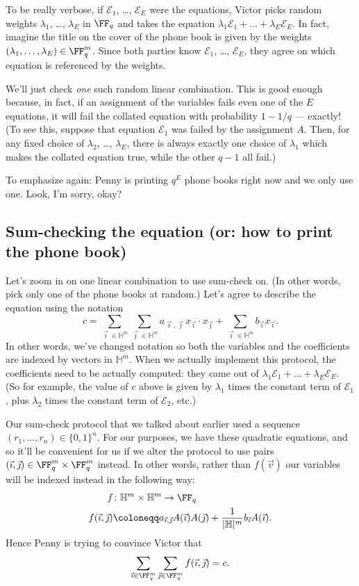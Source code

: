 \documentclass[11pt]{scrreprt}
\newcommand{\HH}{\mathbb H}
\begin{document}
To be really verbose, if $\mathcal{E}_1$, \dots, $\mathcal{E}_E$ were the equations,
Victor picks random weights $\lambda_1$, \dots, $\lambda_E$ in $\FF_q$
and takes the equation $\lambda_1 \mathcal{E}_1 + \dots + \lambda_E \mathcal{E}_E$.
In fact, imagine the title on the cover of the phone book is
given by the weights $(\lambda_1, \dots, \lambda_E) \in \FF_q^m$.
Since both parties know $\mathcal E_1$, \dots, $\mathcal E_E$,
they agree on which equation is referenced by the weights.

We'll just check \emph{one} such random linear combination.
This is good enough because, in fact,
if an assignment of the variables fails even one of the $E$ equations,
it will fail the collated equation with probability $1 - 1/q$ --- exactly!
(To see this, suppose that equation $\mathcal E_1$ was failed by the assignment $A$.
Then, for any fixed choice of $\lambda_2$, \dots, $\lambda_E$, there is always
exactly one choice of $\lambda_1$ which makes the collated equation true,
while the other $q-1$ all fail.)

To emphasize again: Penny is printing $q^E$ phone books right now and we only use one.
Look, I'm sorry, okay?

\subsection{Sum-checking the equation (or: how to print the phone book)}
Let's zoom in on one linear combination to use sum-check on.
(In other words, pick only one of the phone books at random.)
Let's agree to describe the equation using the notation
\[
  c = \sum_{\vec\imath \in \HH^m} \sum_{\vec\jmath \in \HH^m}
  a_{\vec\imath, \vec\jmath} x_{\vec\imath} \cdot x_{\vec\jmath}
  + \sum_{\vec\imath \in \HH^m} b_{\vec\imath} x_{\vec\imath}.
\]
In other words, we've changed notation so both the variables
and the coefficients are indexed by vectors in $\HH^m$.
When we actually implement this protocol, the coefficients need to be actually computed:
they came out of $\lambda_1 \mathcal{E}_1 + \dots + \lambda_E {\mathcal E}_E$.
(So for example, the value of $c$ above is given
by $\lambda_1$ times the constant term of $\mathcal E_1$,
plus $\lambda_2$ times the constant term of $\mathcal E_2$, etc.)

Our sum-check protocol that we talked about earlier
used a sequence $(r_1, \dots, r_n) \in \{0,1\}^n$.
For our purposes, we have these quadratic equations,
and so it'll be convenient for us if we alter the protocol to use pairs
$(\vec\imath, \vec\jmath) \in \FF_q^m \times \FF_q^m$ instead.
In other words, rather than $f(\vec v)$
our variables will be indexed instead in the following way:
\begin{align*}
  f &\colon \HH^m \times \HH^m \to \FF_q \\
  f(\vec\imath, \vec\jmath) &\coloneqq
    a_{\vec\imath, \vec\jmath} A(\vec\imath) A(\vec\jmath)
    + \frac{1}{|\HH|^m} b_{\vec\imath} A(\vec\imath).
\end{align*}
Hence Penny is trying to convince Victor that
\[ \sum_{\vec\imath \in \FF_q^m}
  \sum_{\vec\jmath \in \FF_q^m} f(\vec\imath, \vec\jmath) = c. \]
\end{document}
